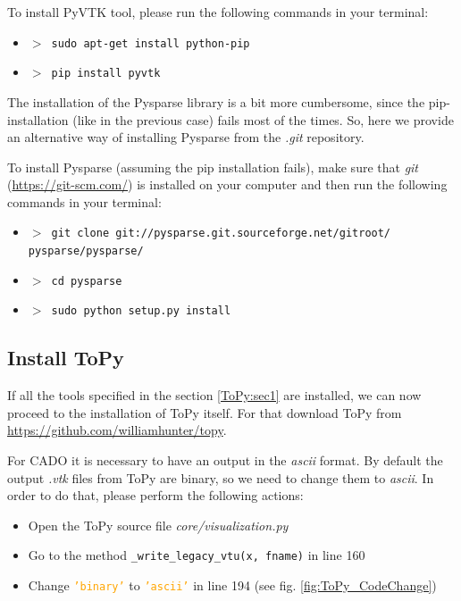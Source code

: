 \documentclass[
12pt, %
a4paper, %
oneside, %
headinclude,footinclude, %
BCOR5mm, %
]{scrartcl}
\begin{document}
	To install PyVTK tool, please run the following commands in your terminal:
\begin{itemize}
\item[] \texttt{\textbf{$>$ }sudo apt-get install python-pip}
\item[] \texttt{\textbf{$>$ }pip install pyvtk}
\end{itemize}
	
	The installation of the Pysparse library is a bit more cumbersome, since the pip-installation (like in the previous case) fails most of the times. So, here we provide an alternative way of installing Pysparse from the \textit{.git} repository.
	
	To install Pysparse (assuming the pip installation fails), make sure that \textit{git} (\href{https://git-scm.com/}{https://git-scm.com/}) is installed on your computer and then run the following commands in your terminal:
\begin{itemize}
\item[] \texttt{\textbf{$>$ }git clone git://pysparse.git.sourceforge.net/gitroot/ \\ pysparse/pysparse/}
\item[] \texttt{\textbf{$>$ }cd pysparse}
\item[] \texttt{\textbf{$>$ }sudo python setup.py install}
\end{itemize}
%	
\subsection{Install ToPy}
	If all the tools specified in the section \ref{ToPy:sec1} are installed, we can now proceed to the installation of ToPy itself. For that download ToPy from \href{https://github.com/williamhunter/topy}{https://github.com/williamhunter/topy}. 

For CADO it is necessary to have an output in the \textit{ascii} format. By default the output \textit{.vtk} files from ToPy are binary, so we need to change them to \textit{ascii}. In order to do that, please perform the following actions:
\begin{itemize}
 		\item Open the ToPy source file \textit{core/visualization.py}
 		\item Go to the method \texttt{{\_}write{\_}legacy{\_}vtu(x, fname)} in line 160

 		\item Change \textcolor{orange}{\texttt{'binary'}} to \textcolor{orange}{\texttt{'ascii'}} in line 194 (see fig. \ref{fig:ToPy_CodeChange})
\end{itemize} 
	
\end{document}
